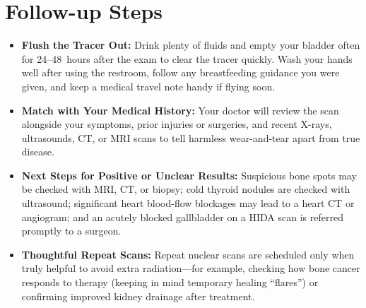 \section{Follow-up Steps}
\begin{itemize}
\item \textbf{Flush the Tracer Out:} Drink plenty of fluids and empty your bladder often for 24--48~hours after the exam to clear the tracer quickly. Wash your hands well after using the restroom, follow any breastfeeding guidance you were given, and keep a medical travel note handy if flying soon.
\item \textbf{Match with Your Medical History:} Your doctor will review the scan alongside your symptoms, prior injuries or surgeries, and recent X-rays, ultrasounds, CT, or MRI scans to tell harmless wear-and-tear apart from true disease.
\item \textbf{Next Steps for Positive or Unclear Results:} Suspicious bone spots may be checked with MRI, CT, or biopsy; cold thyroid nodules are checked with ultrasound; significant heart blood-flow blockages may lead to a heart CT or angiogram; and an acutely blocked gallbladder on a HIDA scan is referred promptly to a surgeon.
\item \textbf{Thoughtful Repeat Scans:} Repeat nuclear scans are scheduled only when truly helpful to avoid extra radiation---for example, checking how bone cancer responds to therapy (keeping in mind temporary healing ``flares'') or confirming improved kidney drainage after treatment.
\end{itemize}

